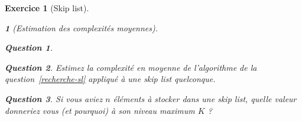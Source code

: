 \documentclass{article}
\theoremstyle{exostyle}
\newtheorem{exo}{Exercice}
\theoremstyle{partiestyle}
\newtheorem{partie}{}[exo]
\theoremstyle{questionstyle}
\newtheorem{questionpartie}{Question}[partie]
\begin{document}
\begin{exo}[Skip list]
\begin{partie}[Estimation des complexités moyennes]
\begin{questionpartie}
        \end{questionpartie}
        \begin{questionpartie}
            Estimez la complexité en moyenne de l'algorithme de la question~\ref{recherche-sl} appliqué à une \textit{skip list} quelconque.
        \end{questionpartie}
        \begin{questionpartie}
            Si vous aviez $n$ éléments à stocker dans une \textit{skip list}, quelle valeur donneriez vous (et pourquoi) à son niveau maximum $K$ ?
        \end{questionpartie}
    \end{partie}






\end{exo}
\end{document}
